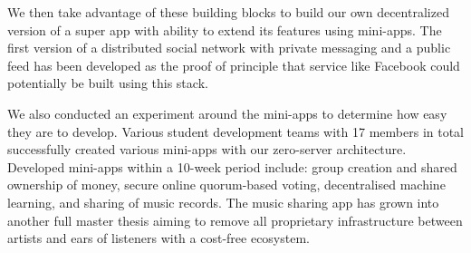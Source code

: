 We then take advantage of these building blocks to build our own decentralized version of a super app with ability to extend its features using mini-apps. The first version of a distributed social network with private messaging and a public feed has been developed as the proof of principle that service like Facebook could potentially be built using this stack.

We also conducted an experiment around the mini-apps to determine how easy they are to develop. Various student development teams with 17 members in total successfully created various mini-apps with our zero-server architecture. Developed mini-apps within a 10-week period include: group creation and shared ownership of money, secure online quorum-based voting, decentralised machine learning, and sharing of music records. The music sharing app has grown into another full master thesis aiming to remove all proprietary infrastructure between artists and ears of listeners with a cost-free ecosystem.

